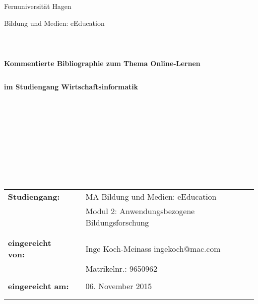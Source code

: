 
\begin{titlepage}
\thispagestyle{empty}
\begin{center}
\color{blue}\Large{Fernuniversität Hagen}\\
\end{center}


\begin{center}
\Large{Bildung und Medien: eEducation}
\end{center}
\begin{verbatim}



\end{verbatim}
\begin{center}
\textbf{\Large{Kommentierte Bibliographie zum Thema Online-Lernen}}
\end{center}
\begin{verbatim}

\end{verbatim}
\begin{center}
\textbf{im Studiengang Wirtschaftsinformatik}
\end{center}
\begin{verbatim}











\end{verbatim}

\begin{flushleft}
\begin{tabular}{lll}
\textbf{Studiengang:} & & MA Bildung und Medien: eEducation\\
& & Modul 2: Anwendungsbezogene Bildungsforschung\\
& & \\
& & \\
\textbf{eingereicht von:} & & {\color{magenta} Inge Koch-Meinass \flq{}ingekoch@mac.com\frq{}}\\
& & {\color{magenta}Matrikelnr.: 9650962 }\\
& & \\
\textbf{eingereicht am:} & & 06. November 2015\\
& & \\
& & \\
\end{tabular}
\end{flushleft}

\end{titlepage}
